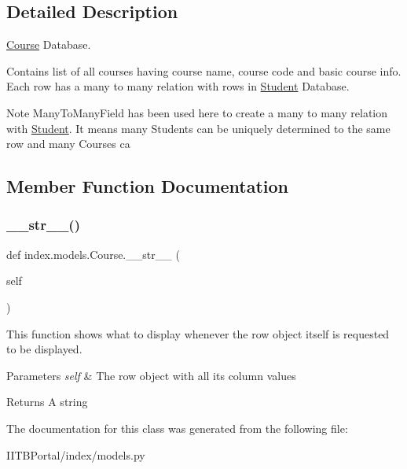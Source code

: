 \subsection{Detailed Description}
\hyperlink{classindex_1_1models_1_1Course}{Course} Database. 

Contains list of all courses having course name, course code and basic course info. Each row has a many to many relation with rows in \hyperlink{classindex_1_1models_1_1Student}{Student} Database. \begin{DoxyNote}{Note}
Many\+To\+Many\+Field has been used here to create a many to many relation with \hyperlink{classindex_1_1models_1_1Student}{Student}. It means many \textquotesingle{}Students\textquotesingle{} can be uniquely determined to the same row and many Courses ca 
\end{DoxyNote}


\subsection{Member Function Documentation}
\mbox{\label{classindex_1_1models_1_1Course_a08db1a3c950dbeaa61e2b0b1c200d4de}} 
\subsubsection{\texorpdfstring{\+\_\+\+\_\+str\+\_\+\+\_\+()}{\_\_str\_\_()}}
{\footnotesize\ttfamily def index.\+models.\+Course.\+\_\+\+\_\+str\+\_\+\+\_\+ (\begin{DoxyParamCaption}\item[{}]{self }\end{DoxyParamCaption})}



This function shows what to display whenever the row object itself is requested to be displayed. 


\begin{DoxyParams}{Parameters}
{\em self} & The row object with all its column values \\
\hline
\end{DoxyParams}
\begin{DoxyReturn}{Returns}
A string 
\end{DoxyReturn}


The documentation for this class was generated from the following file\+:\begin{DoxyCompactItemize}
\item 
I\+I\+T\+B\+Portal/index/models.\+py\end{DoxyCompactItemize}
